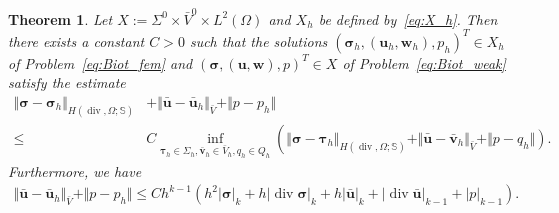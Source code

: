 \documentclass[11pt]{amsart}
\newtheorem{theorem}{Theorem}
\theoremstyle{remark}
\theoremstyle{definition}
\def\sig{{\bm \sigma}}
\def\btau{{\bm \tau}}
\def\bu{{\boldsymbol u}}
\def\bv{{\boldsymbol v}}
\def\bw{{\boldsymbol w}}
\renewcommand{\div}{\operatorname{div}}
\renewcommand{\div}{\operatorname{div}}
\def\sig{\boldsymbol \sigma}
\def\bu{\boldsymbol u}
\def\bv{\boldsymbol v}
\def\bw{\boldsymbol w}
\begin{document}
\begin{theorem}\label{thm:near_best_approx}
Let $X:= \Sigma^0 \times \bar{V}^0 \times L^2(\Omega)$ and $X_h$ be defined by~\eqref{eq:X_h}.
Then there exists a constant $C >0$ such that the solutions $(\sig_h,(\bu_h,\bw_h),p_h)^T \in X_h$ of
Problem~\eqref{eq:Biot_fem} and $(\sig,(\bu,\bw),p)^T \in X$ of Problem~\eqref{eq:Biot_weak} satisfy
the estimate
%
\begin{align}\label{eq:near_best_approx}
\Vert \sig - \sig_h \Vert_{H(\div,\Omega;\mathbb{S})} &+ \Vert \bar{\bu} - \bar{\bu}_h \Vert_{\bar{V}} + \Vert p - p_h \Vert  \nonumber  \\
\le &C \inf_{\btau_h \in \Sigma_h,\bar{\bv}_h \in \bar{V}_h, q_h \in Q_h}
  \left(
\Vert \sig - \btau_h \Vert_{H(\div,\Omega;\mathbb{S})} \right. \left.+ \Vert \bar{\bu} - \bar{\bv}_h \Vert_{\bar{V}} + \Vert p - q_h \Vert
\right).
\end{align} 
Furthermore, we have 
\begin{align}\label{eq:near_best_approx_suboptimal}
 \Vert \bar{\bu} - \bar{\bu}_h \Vert_{\bar{V}} +\Vert p - p_h \Vert \le C h^{k-1}\left(h^2|\sig|_k+h|\div\sig|_k+h|\bar{\bu}|_k+|\div\bar{\bu}|_{k-1}+|p|_{k-1}\right).
 \end{align}
\end{theorem}
\end{document}
